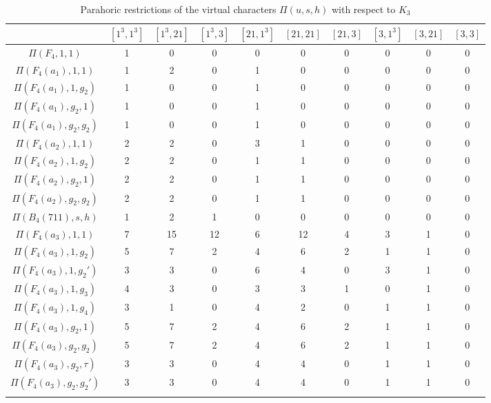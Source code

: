     \begin{table}[!ht]
        \centering
        \caption{Parahoric restrictions of the virtual characters $\Pi(u,s,h)$ with respect to $K_3$} \label{tbl:F4_K3}
        \begin{adjustbox}{max width=\linewidth}
        \begin{tabular}{|c|ccccccccc|}
            \hline
        & $[1^3,1^3]$ & $[1^3,21]$ & $[1^3,3]$ & $[21,1^3]$ & $[21,21]$ & $[21,3]$ & $[3,1^3]$ & $[3,21]$ & $[3,3]$ \\\hline
        $\Pi(F_4,1,1)$ & 1 & 0 & 0 & 0 & 0 & 0 & 0 & 0 & 0 \\\hline
        $\Pi(F_4(a_1),1,1)$ & 1 & 2 & 0 & 1 & 0 & 0 & 0 & 0 & 0 \\
        $\Pi(F_4(a_1),1,g_2)$ & 1 & 0 & 0 & 1 & 0 & 0 & 0 & 0 & 0 \\
        $\Pi(F_4(a_1),g_2,1)$ & 1 & 0 & 0 & 1 & 0 & 0 & 0 & 0 & 0 \\
        $\Pi(F_4(a_1),g_2,g_2)$ & 1 & 0 & 0 & 1 & 0 & 0 & 0 & 0 & 0 \\\hline
        $\Pi(F_4(a_2),1,1)$ & 2 & 2 & 0 & 3 & 1 & 0 & 0 & 0 & 0 \\
        $\Pi(F_4(a_2),1,g_2)$ & 2 & 2 & 0 & 1 & 1 & 0 & 0 & 0 & 0 \\
        $\Pi(F_4(a_2),g_2,1)$ & 2 & 2 & 0 & 1 & 1 & 0 & 0 & 0 & 0 \\
        $\Pi(F_4(a_2),g_2,g_2)$ & 2 & 2 & 0 & 1 & 1 & 0 & 0 & 0 & 0 \\\hline
        $\Pi(B_4(711),s,h)$ & 1 & 2 & 1 & 0 & 0 & 0 & 0 & 0 & 0 \\\hline
        $\Pi(F_4(a_3),1,1)$ & 7 & 15 & 12 & 6 & 12 & 4 & 3 & 1 & 0 \\
        $\Pi(F_4(a_3),1,g_2)$ & 5 & 7 & 2 & 4 & 6 & 2 & 1 & 1 & 0 \\
        $\Pi(F_4(a_3),1,g_2')$ & 3 & 3 & 0 & 6 & 4 & 0 & 3 & 1 & 0 \\
        $\Pi(F_4(a_3),1,g_3)$ & 4 & 3 & 0 & 3 & 3 & 1 & 0 & 1 & 0 \\
        $\Pi(F_4(a_3),1,g_4)$ & 3 & 1 & 0 & 4 & 2 & 0 & 1 & 1 & 0 \\\hdashline
        $\Pi(F_4(a_3),g_2,1)$ & 5 & 7 & 2 & 4 & 6 & 2 & 1 & 1 & 0 \\
        $\Pi(F_4(a_3),g_2,g_2)$ & 5 & 7 & 2 & 4 & 6 & 2 & 1 & 1 & 0 \\
        $\Pi(F_4(a_3),g_2,\tau)$ & 3 & 3 & 0 & 4 & 4 & 0 & 1 & 1 & 0 \\
        $\Pi(F_4(a_3),g_2,g_2')$ & 3 & 3 & 0 & 4 & 4 & 0 & 1 & 1 & 0 \\\hdashline

\end{tabular}
\end{adjustbox}
\end{table}
